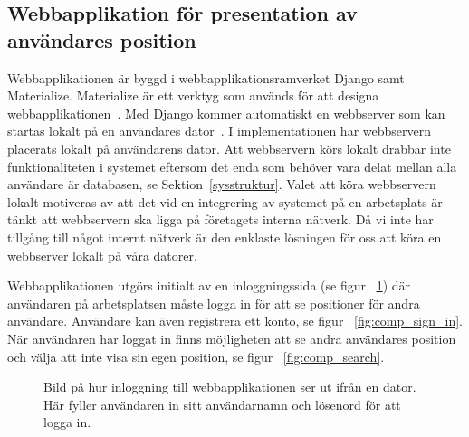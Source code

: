 \documentclass[a4paper,12pt]{article}
\begin{document}
 \subsection{Webbapplikation för presentation av användares position} \label{webbinterface}
 Webbapplikationen är byggd i webbapplikationsramverket Django samt Materialize. Materialize är ett verktyg som används för att designa webbapplikationen~\cite{materialize}. Med Django kommer automatiskt en webbserver som kan startas lokalt på en användares dator~\cite{djangoMVC}. I implementationen har webbservern placerats lokalt på användarens dator. Att webbservern körs lokalt drabbar inte funktionaliteten i systemet eftersom det enda som behöver vara delat mellan alla användare är databasen, se Sektion~\ref{sysstruktur}. Valet att köra webbservern lokalt motiveras av att det vid en integrering av systemet på en arbetsplats är tänkt att webbservern ska ligga på företagets interna nätverk. Då vi inte har tillgång till något internt nätverk är den enklaste lösningen för oss att köra en webbserver lokalt på våra datorer.

 Webbapplikationen utgörs initialt av en inloggningssida (se figur ~\ref{fig:comp_log_in}) där användaren på arbetsplatsen måste logga in för att se positioner för andra användare. Användare kan även registrera ett konto, se figur ~\ref{fig:comp_sign_in}. När användaren har loggat in finns möjligheten att se andra användares position och välja att inte visa sin egen position, se figur ~\ref{fig:comp_search}.

 \begin{figure}[H]
   \centering
   \caption{Bild på hur inloggning till webbapplikationen ser ut ifrån en dator. Här fyller användaren in sitt användarnamn och lösenord för att logga in.}
   \label{fig:comp_log_in}
 \end{figure}
\end{document}
